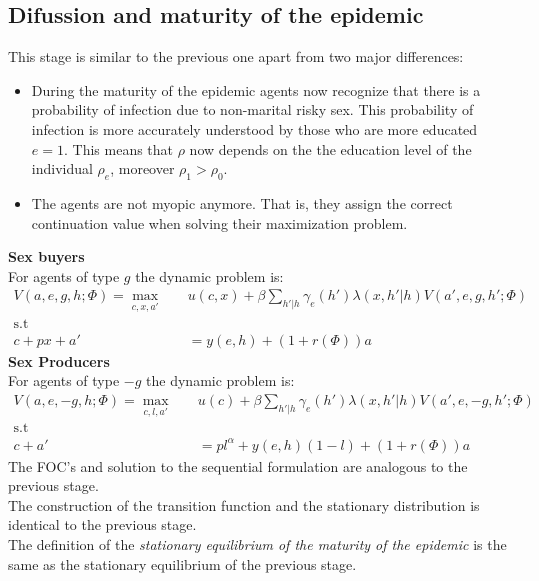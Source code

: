 \subsection{Difussion and maturity of the epidemic}\label{maturity}
This stage is similar to the previous one apart from two major differences:
\begin{itemize}
\item During the maturity of the epidemic agents now recognize that there is a probability of infection due to non-marital risky sex. This probability of infection is more accurately understood by those who are more educated $e=1$. This means that $\rho$ now depends on the the education level of the individual $\rho_{e}$, moreover $\rho_{1}>\rho_{0}$.
\item The agents are not myopic anymore. That is, they assign the correct continuation value when solving their maximization problem.
\end{itemize}
\noindent\textbf{Sex buyers}\\
For agents of type $g$ the dynamic problem is: 
 \begin{align*}
V(a,e,g,h;\Phi) = \max_{c,x,a'} \quad  & u(c,x) + \beta \sum_{h'|h} \gamma_e(h') \lambda(x,h'|h) V(a',e,g,h';\Phi)\\
\mbox{s.t}\\
c+ px +a'&= y(e,h) + (1+r(\Phi))a 
\end{align*}
\noindent\textbf{Sex Producers}\\
For agents of type $-g$ the dynamic problem is: 
 \begin{align*}
V(a,e,-g,h;\Phi) = \max_{c,l,a'} \quad &  u(c) + \beta  \sum_{h'|h} \gamma_e(h') \lambda(x,h'|h)  V(a',e,-g,h';\Phi)\\
\mbox{s.t}\\
c +a'&= pl^{\alpha} + y(e,h)(1-l) + (1+r(\Phi))a   
\end{align*}
The FOC's and solution to the sequential formulation are analogous to the previous stage.\\
The construction of the transition function and the stationary distribution is identical to the previous stage.\\
The definition of the \textit{stationary equilibrium of the maturity of the epidemic} is the same as the stationary equilibrium of the previous stage.

